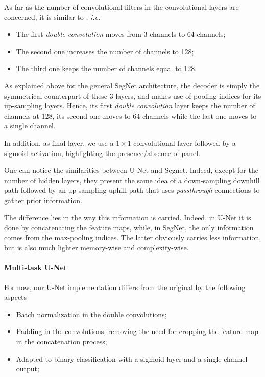 \documentclass[twocolumn,superscriptaddress,aps,nofootinbib]{revtex4-1}
\begin{document}
As far as the number of convolutional filters in the convolutional layers are concerned, it is similar to \cite{camilo2018application}, \emph{i.e.}
\begin{itemize}[noitemsep]
    \item The first \emph{double convolution} moves from 3 channels to 64 channels;
    \item The second one increases the number of channels to 128;
    \item The third one keeps the number of channels equal to 128.
\end{itemize}
As explained above for the general SegNet architecture, the decoder is simply the symmetrical counterpart of these 3 layers, and makes use of pooling indices for its up-sampling layers. Hence, its first \emph{double convolution} layer keeps the number of channels at 128, its second one moves to 64 channels while the last one moves to a single channel.

In addition, as final layer, we use a $1 \times 1$ convolutional layer followed by a sigmoid activation, highlighting the presence/absence of panel.

One can notice the similarities between U-Net and Segnet. Indeed, except for the number of hidden layers, they present the same idea of a down-sampling downhill path followed by an up-sampling uphill path that uses \emph{passthrough} connections to gather prior information.

The difference lies in the way this information is carried. Indeed, in U-Net it is done by concatenating the feature maps, while, in SegNet, the only information comes from the max-pooling indices. The latter obviously carries less information, but is also much lighter memory-wise and complexity-wise.

\vspace{1em}

\paragraph{Multi-task U-Net}

For now, our U-Net implementation differs from the original by the following aspects
\begin{itemize}[noitemsep]
    \item Batch normalization in the double convolutions;
    \item Padding in the convolutions, removing the need for cropping the feature map in the concatenation process;
    \item Adapted to binary classification with a sigmoid layer and a single channel output;
\end{itemize}
\end{document}
